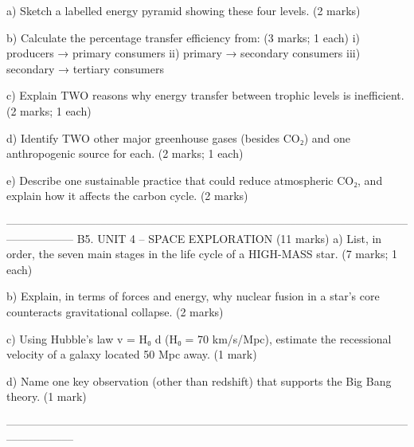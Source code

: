 a) Sketch a labelled energy pyramid showing these four levels. (2 marks)    
  
b) Calculate the percentage transfer efficiency from: (3 marks; 1 each)    
   i) producers → primary consumers    
   ii) primary → secondary consumers    
   iii) secondary → tertiary consumers    
  
c) Explain TWO reasons why energy transfer between trophic levels is inefficient. (2 marks; 1 each)    
  
d) Identify TWO other major greenhouse gases (besides CO₂) and one anthropogenic source for each. (2 marks; 1 each)    
  
e) Describe one sustainable practice that could reduce atmospheric CO₂, and explain how it affects the carbon cycle. (2 marks)    
  
––––––––––––––––––––––––––––––––––––––––––––––––––––––––––––––––––––––––––––––––––––    
B5. UNIT 4 – SPACE EXPLORATION (11 marks)    
a) List, in order, the seven main stages in the life cycle of a HIGH-MASS star. (7 marks; 1 each)    
  
b) Explain, in terms of forces and energy, why nuclear fusion in a star’s core counteracts gravitational collapse. (2 marks)    
  
c) Using Hubble’s law v = H₀ d (H₀ = 70 km/s/Mpc), estimate the recessional velocity of a galaxy located 50 Mpc away. (1 mark)    
  
d) Name one key observation (other than redshift) that supports the Big Bang theory. (1 mark)    
  
––––––––––––––––––––––––––––––––––––––––––––––––––––––––––––––––––––––––––––––––––––    
